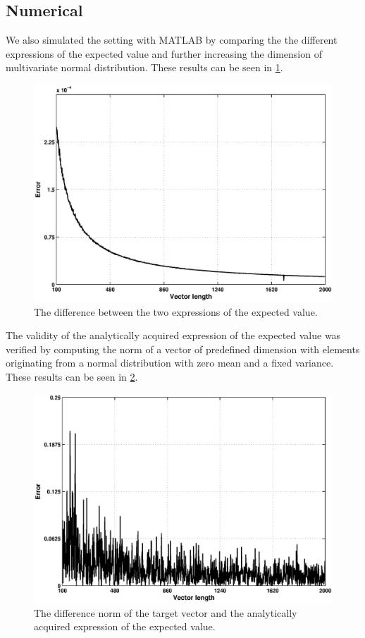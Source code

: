 \documentclass[12pt,a4]{article}
\begin{document}
\subsection{Numerical}
\label{sec:numerical}
We also simulated the setting with MATLAB by comparing the the different expressions of the expected value and further increasing the dimension of multivariate normal distribution. These results can be seen in \cref{fig:err}.
\begin{figure}[H]
\begin{center}
\includegraphics[scale=.4]{img/exp_val_simulation.eps}
\end{center}
\caption{The difference between the two expressions of the expected value.}
\label{fig:err}
\end{figure}
The validity of the analytically acquired expression of the expected value was verified by computing the norm of a vector of predefined dimension with elements originating from a normal distribution with zero mean and a fixed variance. These results can be seen in \cref{fig:errTarget}.
\begin{figure}[H]
\begin{center}
\includegraphics[scale=.5]{img/exp_val_simulation_targetErr.eps}
\end{center}
\caption{The difference norm of the target vector and the analytically acquired expression of the expected value.}
\label{fig:errTarget}
\end{figure}
\end{document}

